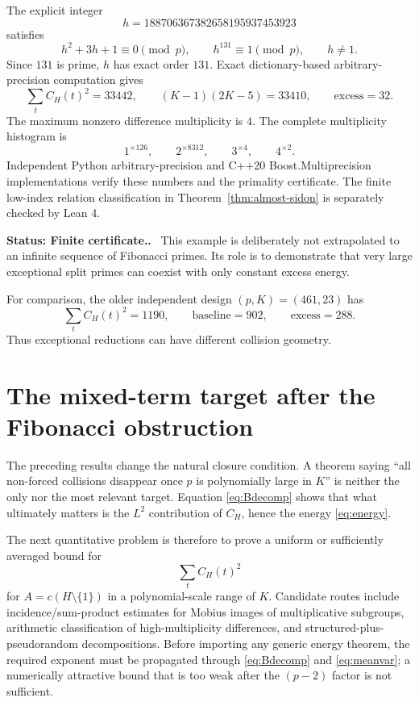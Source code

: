 \documentclass[11pt]{article}
\newcommand{\Status}[1]{\par\smallskip\noindent\textbf{Status: #1.}\ }
\begin{document}
The explicit integer
\[
h=188706367382658195937453923
\]
satisfies
\[
h^2+3h+1\equiv0\pmod p,
\qquad h^{131}\equiv1\pmod p,
\qquad h\ne1.
\]
Since $131$ is prime, $h$ has exact order $131$.  Exact dictionary-based
arbitrary-precision computation gives
\begin{equation}\label{eq:giant}
\sum_t C_H(t)^2=33442,
\qquad
(K-1)(2K-5)=33410,
\qquad
\text{excess}=32.
\end{equation}
The maximum nonzero difference multiplicity is $4$.  The complete
multiplicity histogram is
\[
1^{\times126},\qquad2^{\times8312},\qquad3^{\times4},\qquad4^{\times2}.
\]
Independent Python arbitrary-precision and C++20 Boost.Multiprecision
implementations verify these numbers and the primality certificate.  The
finite low-index relation classification in
Theorem~\ref{thm:almost-sidon} is separately checked by Lean 4.

\Status{Finite certificate.}  This example is deliberately not extrapolated to
an infinite sequence of Fibonacci primes.  Its role is to demonstrate that
very large exceptional split primes can coexist with only constant excess
energy.

For comparison, the older independent design $(p,K)=(461,23)$ has
\[
\sum_tC_H(t)^2=1190,\qquad\text{baseline}=902,\qquad\text{excess}=288.
\]
Thus exceptional reductions can have different collision geometry.

\section{The mixed-term target after the Fibonacci obstruction}

The preceding results change the natural closure condition.  A theorem saying
``all non-forced collisions disappear once $p$ is polynomially large in $K$''
is neither the only nor the most relevant target.  Equation
\eqref{eq:Bdecomp} shows that what ultimately matters is the $L^2$ contribution
of $C_H$, hence the energy \eqref{eq:energy}.

The next quantitative problem is therefore to prove a uniform or sufficiently
averaged bound for
\[
\sum_t C_H(t)^2
\]
for $A=c(H\setminus\{1\})$ in a polynomial-scale range of $K$.  Candidate
routes include incidence/sum-product estimates for Mobius images of
multiplicative subgroups, arithmetic classification of high-multiplicity
differences, and structured-plus-pseudorandom decompositions.  Before importing
any generic energy theorem, the required exponent must be propagated through
\eqref{eq:Bdecomp} and \eqref{eq:meanvar}; a numerically attractive bound that
is too weak after the $(p-2)$ factor is not sufficient.
\end{document}
